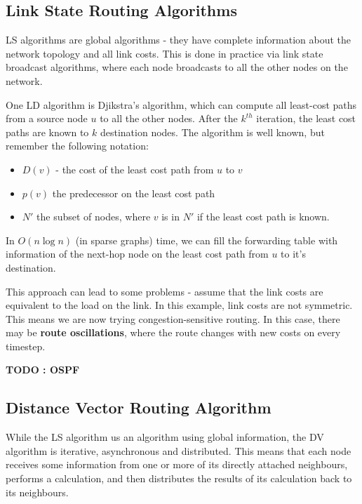 \documentclass[12pt,letterpaper]{book}
\theoremstyle{definition}
\begin{document}
\subsection{Link State Routing Algorithms}

LS algorithms are global algorithms - they have complete information about the network topology and all link costs. This is done in practice via link state broadcast algorithms, where each node broadcasts to all the other nodes on the network.

One LD algorithm is Djikstra's algorithm, which can compute all least-cost paths from a source node $u$ to all the other nodes. After the $k^{th}$ iteration, the least cost paths are known to $k$ destination nodes. The algorithm is well known, but remember the following notation:
\begin{itemize}
  \item $D(v)$ - the cost of the least cost path from $u$ to $v$
  \item $p(v)$ the predecessor on the least cost path
  \item $N'$ the subset of nodes, where $v$ is in $N'$ if the least cost path is known.
\end{itemize}

In $O(n \log n)$ (in sparse graphs) time, we can fill the forwarding table with information of the next-hop node on the least cost path from $u$ to it's destination.

This approach can lead to some problems - assume that the link costs are equivalent to the load on the link. In this example, link costs are not symmetric. This means we are now trying congestion-sensitive routing. In this case, there may be \textbf{route oscillations}, where the route changes with new costs on every timestep.

\textbf{TODO : OSPF}

\subsection{Distance Vector Routing Algorithm}

While the LS algorithm us an algorithm using global information, the DV algorithm is iterative, asynchronous and distributed. This means that each node receives some information from one or more of its directly attached neighbours, performs a calculation, and then distributes the results of its calculation back to its neighbours.
\end{document}
